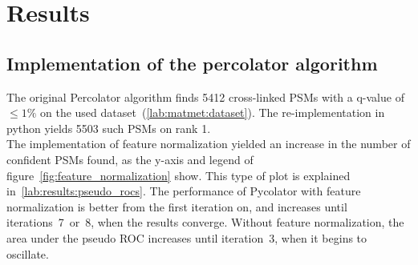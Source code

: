 \chapter{Results}
\label{results}


\section{Implementation of the percolator algorithm}
The original Percolator algorithm finds 5412 cross-linked PSMs with a q-value of $\leq1\%$ on the used dataset~(\ref{lab:matmet:dataset}). The re-implementation in python yields 5503 such PSMs on rank 1.\\
The implementation of feature normalization yielded an increase in the number of confident PSMs found, as the y-axis and legend of figure~\ref{fig:feature_normalization} show. This type of plot is explained in~\autoref{lab:results:pseudo_rocs}. The performance of Pycolator with feature normalization is better from the first iteration on, and increases until iterations~7~or~8, when the results converge. Without feature normalization, the area under the pseudo ROC increases until iteration~3, when it begins to oscillate. \\
\renewcommand{\baselinestretch}{0.9}
